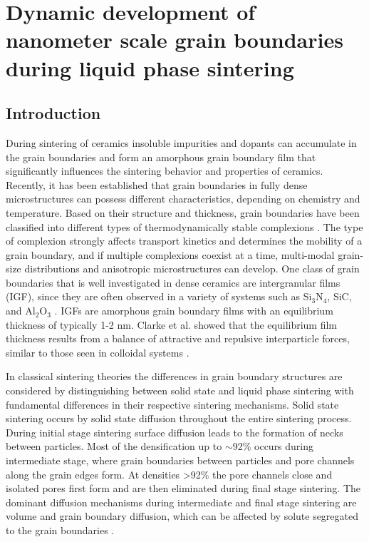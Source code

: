 \chapter{Dynamic development of nanometer scale grain boundaries during liquid phase sintering}

\section{Introduction}

During sintering of ceramics insoluble impurities and dopants can accumulate in the grain boundaries and form an amorphous grain boundary film that significantly influences the sintering behavior and properties of ceramics. Recently, it has been established that grain boundaries in fully dense microstructures can possess different characteristics, depending on chemistry and temperature. Based on their structure and thickness, grain boundaries have been classified into different types of thermodynamically stable complexions \cite{Dillon2007}. The type of complexion strongly affects transport kinetics and determines the mobility of a grain boundary, and if multiple complexions coexist at a time, multi-modal grain-size distributions and anisotropic microstructures can develop. One class of grain boundaries that is well investigated in dense ceramics are intergranular films (IGF), since they are often observed in a variety of systems such as Si$_{3}$N$_{4}$, SiC, and Al$_{2}$O$_{3}$ \cite{Subramaniam2006,Clarke1993}. IGFs are amorphous grain boundary films with an equilibrium thickness of typically 1-2 nm. Clarke et al. showed that the equilibrium film thickness results from a balance of attractive and repulsive interparticle forces, similar to those seen in colloidal systems \cite{Clarke1987,Clarke1993}.

In classical sintering theories the differences in grain boundary structures are considered by distinguishing between solid state and liquid phase sintering with fundamental differences in their respective sintering mechanisms. Solid state sintering occurs by solid state diffusion throughout the entire sintering process. During initial stage sintering surface diffusion leads to the formation of necks between particles. Most of the densification up to $\sim$92\% occurs during intermediate stage, where grain boundaries between particles and pore channels along the grain edges form. At densities >92\% the pore channels close and isolated pores first form and are then eliminated during final stage sintering. The dominant diffusion mechanisms during intermediate and final stage sintering are volume and grain boundary diffusion, which can be affected by solute segregated to the grain boundaries \cite{Dillon2007}. 

